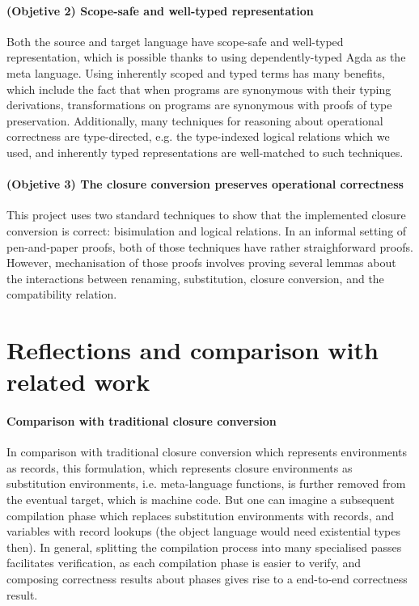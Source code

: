 \documentclass[bsc,frontabs,oneside,singlespacing,parskip,deptreport]{infthesis}
\theoremstyle{definition}
\theoremstyle{lemma}
\begin{document}
\paragraph{(Objetive 2) Scope-safe and well-typed representation}
Both the source and target language have scope-safe and well-typed
representation, which is possible thanks to using dependently-typed
Agda as the meta language. Using inherently scoped and typed terms has
many benefits, which include the fact that when programs are
synonymous with their typing derivations, transformations on programs
are synonymous with proofs of type preservation. Additionally, many
techniques for reasoning about operational correctness are
type-directed, e.g. the type-indexed logical relations which we used,
and inherently typed representations are well-matched to such
techniques.

\paragraph{(Objetive 3) The closure conversion preserves operational correctness}
This project uses two standard techniques to show that the implemented
closure conversion is correct: bisimulation and logical relations. In
an informal setting of pen-and-paper proofs, both of those techniques
have rather straighforward proofs. However, mechanisation of those
proofs involves proving several lemmas about the interactions between
renaming, substitution, closure conversion, and the compatibility
relation.

\section{Reflections and comparison with related work}
\label{sec:refl-comp-with}

\paragraph{Comparison with traditional closure conversion}
In comparison with traditional closure conversion which represents
environments as records, this formulation, which represents closure
environments as substitution environments, i.e. meta-language
functions, is further removed from the eventual target, which is
machine code. But one can imagine a subsequent compilation phase which
replaces substitution environments with records, and variables with
record lookups (the object language would need existential types
then). In general, splitting the compilation process into many
specialised passes facilitates verification, as each compilation phase
is easier to verify, and composing correctness results about phases
gives rise to a end-to-end correctness result.
\end{document}
